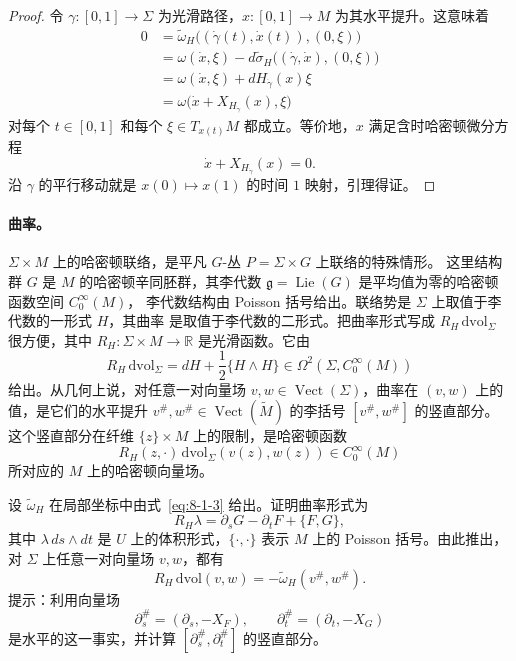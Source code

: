 \begin{proof}
令 $\gamma:[0,1]\to\Sigma$ 为光滑路径，$x:[0,1]\to M$ 为其水平提升。这意味着
\begin{align*}
  0
  &=\widetilde\omega_H\bigl((\dot\gamma(t),\dot x(t)),(0,\xi)\bigr)\\
  &=\omega(\dot x,\xi)
    -d\widetilde\sigma_H\bigl((\dot\gamma,\dot x),(0,\xi)\bigr)\\
  &=\omega(\dot x,\xi)+dH_{\dot\gamma}(x)\xi\\
  &=\omega\bigl(\dot x+X_{H_{\dot\gamma}}(x),\xi\bigr)
\end{align*}
对每个 $t\in[0,1]$ 和每个 $\xi\in T_{x(t)}M$ 都成立。等价地，$x$ 满足含时哈密顿微分方程
\[
  \dot x+X_{H_{\dot\gamma}}(x)=0.
\]
沿 $\gamma$ 的平行移动就是 $x(0)\mapsto x(1)$ 的时间 $1$ 映射，引理得证。
\end{proof}

\paragraph{曲率。}
$\Sigma\times M$ 上的哈密顿联络，是平凡 $G$-丛 $P=\Sigma\times G$ 上联络的特殊情形。
这里结构群 $G$ 是 $M$ 的哈密顿辛同胚群，其李代数
$\mathfrak g=\operatorname{Lie}(G)$ 是平均值为零的哈密顿函数空间 $C_0^\infty(M)$，
李代数结构由 Poisson 括号给出。联络势是 $\Sigma$ 上取值于李代数的一形式 $H$，其曲率
是取值于李代数的二形式。把曲率形式写成 $R_H\,\mathrm{dvol}_\Sigma$ 很方便，其中
$R_H:\Sigma\times M\to\mathbb R$ 是光滑函数。它由
\[
  R_H\,\mathrm{dvol}_\Sigma
  =dH+\frac12\{H\wedge H\}
  \in\Omega^2(\Sigma,C_0^\infty(M))
\]
给出。从几何上说，对任意一对向量场
$v,w\in\operatorname{Vect}(\Sigma)$，曲率在 $(v,w)$ 上的值，是它们的水平提升
$v^\#,w^\#\in\operatorname{Vect}(\widetilde M)$ 的李括号 $[v^\#,w^\#]$ 的竖直部分。
这个竖直部分在纤维 $\{z\}\times M$ 上的限制，是哈密顿函数
\[
  R_H(z,\mathord\cdot)\,\mathrm{dvol}_\Sigma(v(z),w(z))
  \in C_0^\infty(M)
\]
所对应的 $M$ 上的哈密顿向量场。

\begin{exercise}\label{ex:8-1-2}
设 $\widetilde\omega_H$ 在局部坐标中由式~\eqref{eq:8-1-3} 给出。证明曲率形式为
\[
  R_H\lambda=\partial_sG-\partial_tF+\{F,G\},
\]
其中 $\lambda\,ds\wedge dt$ 是 $U$ 上的体积形式，$\{\mathord\cdot,\mathord\cdot\}$
表示 $M$ 上的 Poisson 括号。由此推出，对 $\Sigma$ 上任意一对向量场 $v,w$，都有
\[
  R_H\,\mathrm{dvol}(v,w)=-\widetilde\omega_H(v^\#,w^\#).
\]
提示：利用向量场
\[
  \partial_s^\#=(\partial_s,-X_F),
  \qquad
  \partial_t^\#=(\partial_t,-X_G)
\]
是水平的这一事实，并计算 $[\partial_s^\#,\partial_t^\#]$ 的竖直部分。
\end{exercise}

